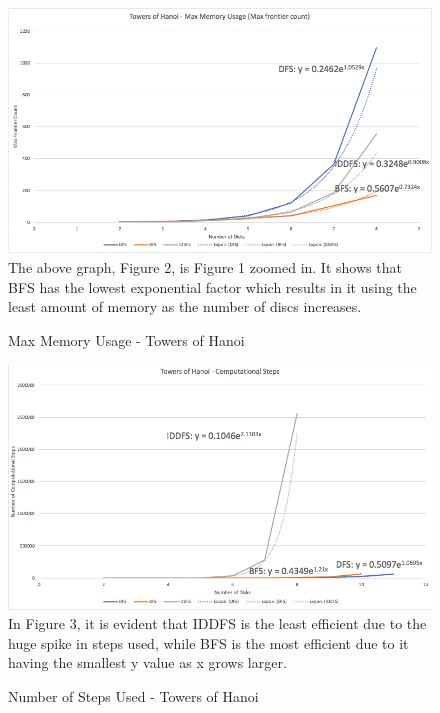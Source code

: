 \documentclass{article}
\begin{document}
\begin{figure}[!htb]
\caption{Max Memory Usage - Towers of Hanoi}
\includegraphics[width=\textwidth]{MemFew.png}
The above graph, Figure 2, is Figure 1 zoomed in. It shows that BFS has the lowest exponential factor which results in it using the least amount of memory as the number of discs increases.
\end{figure}

\begin{figure}[!htb]
\caption{Number of Steps Used - Towers of Hanoi}
\includegraphics[width=\textwidth]{Steps.png}
In Figure 3, it is evident that IDDFS is the least efficient due to the huge spike in steps used, while BFS is the most efficient due to it having the smallest y value as x grows larger.
\end{figure}
\end{document}
